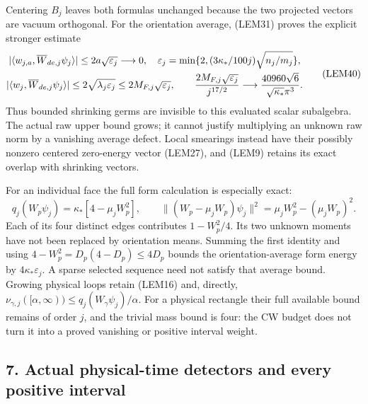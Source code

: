 \documentclass[11pt]{article}
\begin{document}
Centering \(B_j\) leaves both formulas unchanged because the two projected vectors are vacuum orthogonal. For the orientation average, (LEM31) proves the explicit stronger estimate
\[
\begin{gathered}
|\langle w_{j,a},\overline W_{de,j}\psi_j\rangle|
 \le2a\sqrt{\varepsilon_j}\longrightarrow0,\quad
\varepsilon_j=\min\{2,(3\kappa_*/100j)\sqrt{n_j/m_j}\},\\
|\langle w_j,\overline W_{de,j}\psi_j\rangle|
 \le2\sqrt{\lambda_j\varepsilon_j}
 \le2M_{F,j}\sqrt{\varepsilon_j},\qquad
{2M_{F,j}\sqrt{\varepsilon_j}\over j^{17/2}}
 \longrightarrow {40960\sqrt6\over\sqrt{\kappa_*}\pi^3}.
\end{gathered}\tag{LEM40}
\]
Thus bounded shrinking germs are invisible to this evaluated scalar subalgebra. The actual raw upper bound grows; it cannot justify multiplying an unknown raw norm by a vanishing average defect. Local smearings instead have their possibly nonzero centered zero-energy vector (LEM27), and (LEM9) retains its exact overlap with shrinking vectors.

For an individual face the full form calculation is especially exact:
\[
q_j(W_p\psi_j)=\kappa_*[4-\mu_jW_p^2],\qquad
\| (W_p-\mu_jW_p)\psi_j\|^2
=\mu_jW_p^2-(\mu_jW_p)^2.
\tag{LEM41}
\]
Each of its four distinct edges contributes \(1-W_p^2/4\). Its two unknown moments have not been replaced by orientation means. Summing the first identity and using \(4-W_p^2=D_p(4-D_p)\le4D_p\) bounds the orientation-average form energy by \(4\kappa_*\varepsilon_j\). A sparse selected sequence need not satisfy that average bound. Growing physical loops retain (LEM16) and, directly, \(\nu_{\gamma,j}([\alpha,\infty))\le q_j(W_\gamma\psi_j)/\alpha\). For a physical rectangle their full available bound remains of order \(j\), and the trivial mass bound is four: the CW budget does not turn it into a proved vanishing or positive interval weight.

\subsection*{7. Actual physical-time detectors and every positive interval}
\end{document}
